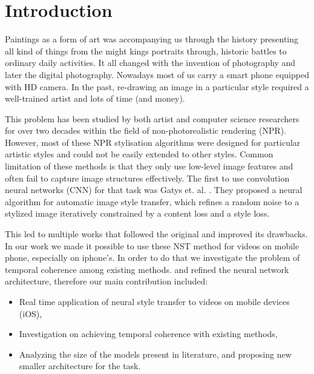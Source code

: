 \documentclass[a4paper,conference]{IEEEtran}
\begin{document}

\section{Introduction}

Paintings as a form of art was  accompanying us through the history presenting all kind of things from the might kings portraits through, historic battles to ordinary daily activities. It all changed with the invention of photography and later the digital photography. Nowadays most of us carry a smart phone equipped with HD camera. In the past, re-drawing an image in a particular style required a well-trained artist and lots of time (and money).  

This problem has been studied by both artist and computer science researchers for over two decades within the field of non-photorealistic rendering (NPR). However, most of these NPR stylisation algorithms were designed for particular artistic styles and could not be easily extended to other styles. Common limitation of these methods is that they only use low-level image features and often fail to capture image structures effectively. The first to use convolution neural networks (CNN) for that task was Gatys et. al. \cite{Gatys2016ImageST,GatysEB15archivix}. They proposed a neural algorithm for automatic image style transfer, which refines a random noise to a stylized image iteratively constrained by a content loss and a style loss. 

This led to multiple works that followed the original and improved its drawbacks. 
In our work we made it possible to use these NST method for videos on mobile phone, especially on iphone's. 
In order to do that we investigate the problem of temporal coherence among existing methods.  and refined the neural network architecture, therefore  our main contribution included:

\begin{itemize}
\item Real time application of neural style transfer to videos on mobile devices (iOS),
\item Investigation on achieving temporal coherence with existing methods,
\item Analyzing the size of the models present in literature, and proposing new smaller architecture for the task.
\end{itemize}
\end{document}
